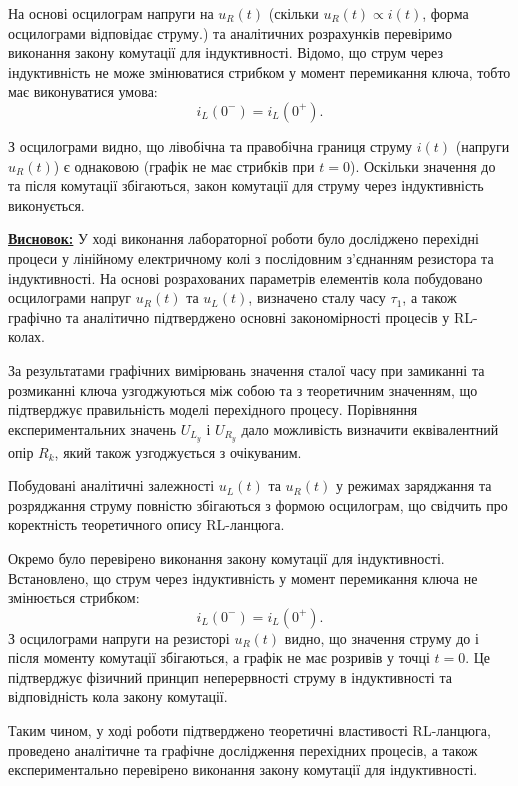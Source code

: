 \documentclass[12pt,a4paper]{article}
\begin{document}
    На основі осцилограм напруги на $u_R(t)$ (скільки $u_R(t) \propto i(t)$, форма осцилограми відповідає струму.) та аналітичних розрахунків перевіримо виконання 
    закону комутації для індуктивності. Відомо, що струм через індуктивність не може 
    змінюватися стрибком у момент перемикання ключа, тобто має виконуватися умова:
    \[
    i_L(0^-) = i_L(0^+).
    \]

    З осцилограми видно, що лівобічна та правобічна границя струму $i(t)$ (напруги $u_R(t)$) є однаковою (графік не має стрибків при $t=0$). Оскільки значення до та після комутації збігаються,
    закон комутації для струму через індуктивність виконується.

    \vspace{1em}

    \noindent
    \textbf{\underline{Висновок:}} У ході виконання лабораторної роботи було досліджено перехідні процеси у
    лінійному електричному колі з послідовним з'єднанням резистора та
    індуктивності. На основі розрахованих параметрів елементів кола побудовано
    осцилограми напруг $u_R(t)$ та $u_L(t)$, визначено сталу часу
    $\tau_1$, а також графічно та аналітично підтверджено основні закономірності
    процесів у RL-колах.

    За результатами графічних вимірювань значення сталої часу при
    замиканні та розмиканні ключа узгоджуються між собою та з теоретичним
    значенням, що підтверджує правильність моделі перехідного процесу.
    Порівняння експериментальних значень $U_{L_y}$ і $U_{R_y}$ дало можливість
    визначити еквівалентний опір $R_k$, який також узгоджується з очікуваним.

    Побудовані аналітичні залежності $u_L(t)$ та $u_R(t)$ у режимах
    заряджання та розряджання струму повністю збігаються з формою осцилограм,
    що свідчить про коректність теоретичного опису RL-ланцюга.

    Окремо було перевірено виконання закону комутації для індуктивності.
    Встановлено, що струм через індуктивність у момент перемикання ключа не
    змінюється стрибком:
    \[
    i_L(0^-) = i_L(0^+).
    \]
    З осцилограми напруги на резисторі $u_R(t)$ видно, що значення струму до і
    після моменту комутації збігаються, а графік не має розривів у точці
    $t=0$. Це підтверджує фізичний принцип неперервності струму в
    індуктивності та відповідність кола закону комутації.

    Таким чином, у ході роботи підтверджено теоретичні властивості RL-ланцюга,
    проведено аналітичне та графічне дослідження перехідних процесів, а також
    експериментально перевірено виконання закону комутації для індуктивності.
\end{document}
